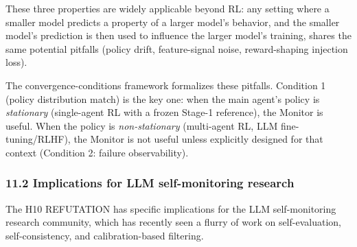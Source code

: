 \documentclass[
]{article}
\begin{document}
These three properties are widely applicable beyond RL: any setting
where a smaller model predicts a property of a larger model's behavior,
and the smaller model's prediction is then used to influence the larger
model's training, shares the same potential pitfalls (policy drift,
feature-signal noise, reward-shaping injection loss).

The convergence-conditions framework formalizes these pitfalls.
Condition 1 (policy distribution match) is the key one: when the main
agent's policy is \emph{stationary} (single-agent RL with a frozen
Stage-1 reference), the Monitor is useful. When the policy is
\emph{non-stationary} (multi-agent RL, LLM fine-tuning/RLHF), the
Monitor is not useful unless explicitly designed for that context
(Condition 2: failure observability).

\subsubsection{11.2 Implications for LLM self-monitoring
research}\label{implications-for-llm-self-monitoring-research}

The H10 REFUTATION has specific implications for the LLM self-monitoring
research community, which has recently seen a flurry of work on
self-evaluation, self-consistency, and calibration-based filtering.
\end{document}

